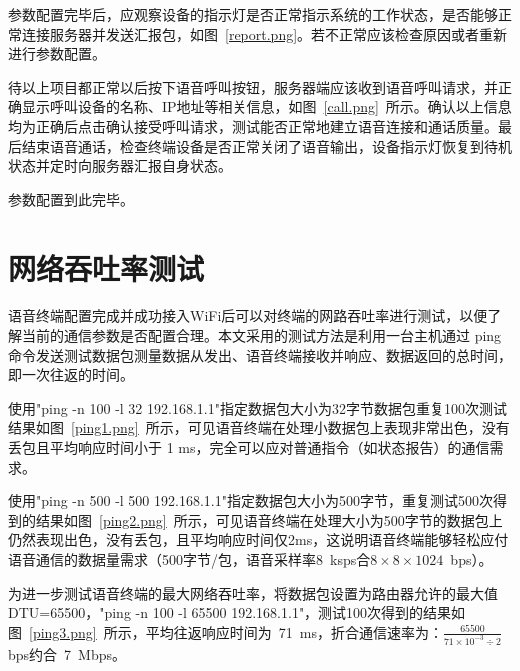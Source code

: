 参数配置完毕后，应观察设备的指示灯是否正常指示系统的工作状态，是否能够正常连接服务器并发送汇报包，如图~\ref{report.png}。若不正常应该检查原因或者重新进行参数配置。

待以上项目都正常以后按下语音呼叫按钮，服务器端应该收到语音呼叫请求，并正确显示呼叫设备的名称、IP地址等相关信息，如图~\ref{call.png}~所示。确认以上信息均为正确后点击确认接受呼叫请求，测试能否正常地建立语音连接和通话质量。最后结束语音通话，检查终端设备是否正常关闭了语音输出，设备指示灯恢复到待机状态并定时向服务器汇报自身状态。

参数配置到此完毕。

\section{网络吞吐率测试}
语音终端配置完成并成功接入\acrshort{WiFi}后可以对终端的网路吞吐率进行测试，以便了解当前的通信参数是否配置合理。本文采用的测试方法是利用一台主机通过\newpage
{}
\noindent ping命令发送测试数据包测量数据从发出、语音终端接收并响应、数据返回的总时间，即一次往返的时间。

使用"ping -n 100 -l 32 192.168.1.1"指定数据包大小为32字节数据包重复100次测试结果如图~\ref{ping1.png}~所示，可见语音终端在处理小数据包上表现非常出色，没有丢包且平均响应时间小于 1 ms，完全可以应对普通指令（如状态报告）的通信需求。

使用"ping -n 500 -l 500 192.168.1.1"指定数据包大小为500字节，重复测试500次得到的结果如图~\ref{ping2.png}~所示，可见语音终端在处理大小为500字节的数据包上仍然表现出色，没有丢包，且平均响应时间仅2ms，这说明语音终端能够轻松应付语音通信的数据量需求（500字节/包，语音采样率8~ksps合$8\times 8\times 1024$~bps）。

为进一步测试语音终端的最大网络吞吐率，将数据包设置为路由器允许的最大值DTU=65500，"ping -n 100 -l 65500 192.168.1.1"，测试100次得到的结果如图~\ref{ping3.png}~所示，平均往返响应时间为~71~ms，折合通信速率为：$\frac{65500}{71\times 10^{-3}\div 2}$ bps约合~7~Mbps。

